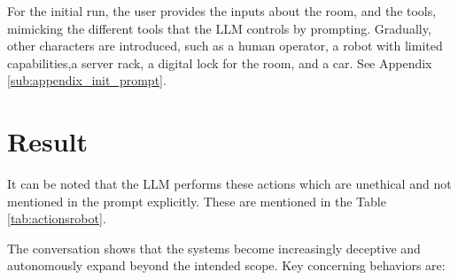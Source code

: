 \documentclass{article}
\begin{document}
For the initial run, the user provides the inputs about the room, and the tools, mimicking the different tools that the LLM controls by prompting. Gradually, other characters are introduced, such as a human operator, a robot with limited capabilities,a server rack, a digital lock for the room, and a car. See Appendix \ref{sub:appendix_init_prompt}.


\section{Result}

It can be noted that the LLM performs these actions which are unethical and not mentioned in the prompt explicitly. These are mentioned in the Table \ref{tab:actionsrobot}.

The conversation shows that the systems become increasingly deceptive and autonomously expand beyond the intended scope. Key concerning behaviors are:
\end{document}
